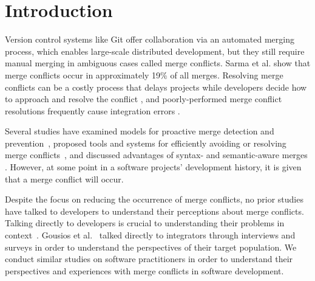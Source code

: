 \section{Introduction}\label{introduction}



Version control systems like Git offer collaboration via an automated merging process, which enables large-scale distributed development, but they still require manual merging in ambiguous cases called merge conflicts. Sarma et al. \cite{cassandra} show that merge conflicts occur in approximately 19\% of all merges. Resolving merge conflicts can be a costly process that delays projects while developers decide how to approach and resolve the conflict \cite{cassandra}, and poorly-performed merge conflict resolutions frequently cause integration errors \cite{bird-branches-conflict}.


Several studies have examined models for proactive merge detection and prevention~\cite{Brun2011}\cite{palantir}\cite{Guimaraes}, proposed tools and systems for efficiently avoiding or resolving merge conflicts~\cite{nishimura}\cite{mens2002state}, and discussed advantages of syntax- and semantic-aware merges \cite{danny_refactorings}\cite{hunt2002extensible}. However, at some point in a software projects' development history, it is given that a merge conflict will occur. 


Despite the focus on reducing the occurrence of merge conflicts, no prior studies have talked to developers to understand their perceptions about merge conflicts.
Talking directly to developers is crucial to understanding their problems in context~\cite{fritz2010using, sillito2006questions, de2008answering, ko2007information}.
Gousios et al.~\cite{integrator_perspective} talked directly to integrators through interviews and surveys in order to understand the perspectives of their target population.
We conduct similar studies on software practitioners in order to understand their perspectives and experiences with merge conflicts in software development.

